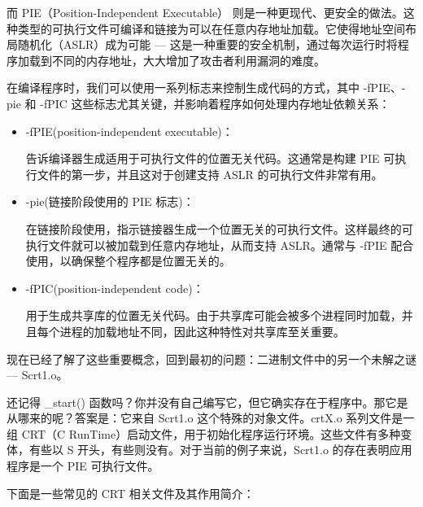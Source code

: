而 PIE（Position-Independent Executable） 则是一种更现代、更安全的做法。这种类型的可执行文件可编译和链接为可以在任意内存地址加载。它使得地址空间布局随机化（ASLR）成为可能 --- 这是一种重要的安全机制，通过每次运行时将程序加载到不同的内存地址，大大增加了攻击者利用漏洞的难度。

在编译程序时，我们可以使用一系列标志来控制生成代码的方式，其中 -fPIE、-pie 和 -fPIC 这些标志尤其关键，并影响着程序如何处理内存地址依赖关系：

\begin{itemize}
\item 
-fPIE(position-independent executable)：

告诉编译器生成适用于可执行文件的位置无关代码。这通常是构建 PIE 可执行文件的第一步，并且这对于创建支持 ASLR 的可执行文件非常有用。

\item 
-pie(链接阶段使用的 PIE 标志)：

在链接阶段使用，指示链接器生成一个位置无关的可执行文件。这样最终的可执行文件就可以被加载到任意内存地址，从而支持 ASLR。通常与 -fPIE 配合使用，以确保整个程序都是位置无关的。

\item 
-fPIC(position-independent code)：

用于生成共享库的位置无关代码。由于共享库可能会被多个进程同时加载，并且每个进程的加载地址不同，因此这种特性对共享库至关重要。
\end{itemize}

现在已经了解了这些重要概念，回到最初的问题：二进制文件中的另一个未解之谜 --- Scrt1.o。

还记得 \_start() 函数吗？你并没有自己编写它，但它确实存在于程序中。那它是从哪来的呢？答案是：它来自 Scrt1.o 这个特殊的对象文件。crtX.o 系列文件是一组 CRT（C RunTime）启动文件，用于初始化程序运行环境。这些文件有多种变体，有些以 S 开头，有些则没有。对于当前的例子来说，Scrt1.o 的存在表明应用程序是一个 PIE 可执行文件。

下面是一些常见的 CRT 相关文件及其作用简介：

